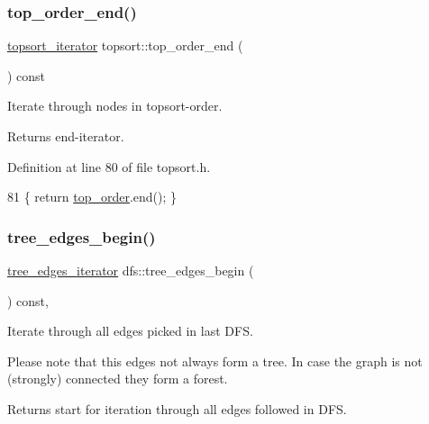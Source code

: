 \subsubsection{\texorpdfstring{top\+\_\+order\+\_\+end()}{top\_order\_end()}}
{\footnotesize\ttfamily \mbox{\hyperlink{classtopsort_a04a42f813522640e17dddbaeb55498e4}{topsort\+\_\+iterator}} topsort\+::top\+\_\+order\+\_\+end (\begin{DoxyParamCaption}{ }\end{DoxyParamCaption}) const\hspace{0.3cm}{\ttfamily [inline]}}

Iterate through nodes in topsort-\/order.

\begin{DoxyReturn}{Returns}
end-\/iterator. 
\end{DoxyReturn}


Definition at line 80 of file topsort.\+h.


\begin{DoxyCode}
81     \{ \textcolor{keywordflow}{return} \mbox{\hyperlink{classtopsort_a8b18b1b7ce816683694d6ac567e55cb8}{top\_order}}.end(); \}
\end{DoxyCode}
\mbox{\label{classdfs_afe193938a05b114870c19163731273c8}} 
\subsubsection{\texorpdfstring{tree\+\_\+edges\+\_\+begin()}{tree\_edges\_begin()}}
{\footnotesize\ttfamily \mbox{\hyperlink{classdfs_accde8d5403404f6d22fe4756d4ffedd5}{tree\+\_\+edges\+\_\+iterator}} dfs\+::tree\+\_\+edges\+\_\+begin (\begin{DoxyParamCaption}{ }\end{DoxyParamCaption}) const\hspace{0.3cm}{\ttfamily [inline]}, {\ttfamily [inherited]}}



Iterate through all edges picked in last D\+FS. 

Please note that this edges not always form a tree. In case the graph is not (strongly) connected they form a forest.

\begin{DoxyReturn}{Returns}
start for iteration through all edges followed in D\+FS. 
\end{DoxyReturn}



